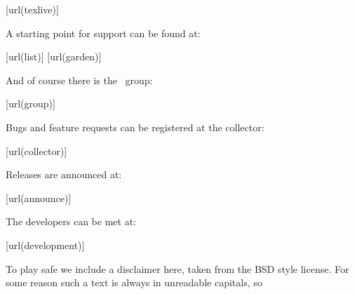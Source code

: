 \startlines
\goto{\url[texlive]}[url(texlive)]
\stoplines

A starting point for support can be found at:

\startlines
\goto{\url[list]}[url(list)]
\goto{\url[garden]}[url(garden)]
\stoplines

And of course there is the \CONTEXT\ group:

\startlines
\goto{\url[group]}[url(group)]
\stoplines

Bugs and feature requests can be registered at the collector:

\startlines
\goto{\url[collector]}[url(collector)]
\stoplines

Releases are announced at:

\startlines
\goto{\url[announce]}[url(announce)]
\stoplines

The developers can be met at:

\startlines
\goto{\url[development]}[url(development)]
\stoplines

\stopsubject


%
%

\startsubject[title={Disclaimer}]

To play safe we include a disclaimer here, taken from the BSD style license. For
some reason such a text is always in unreadable capitals, so \unknown

